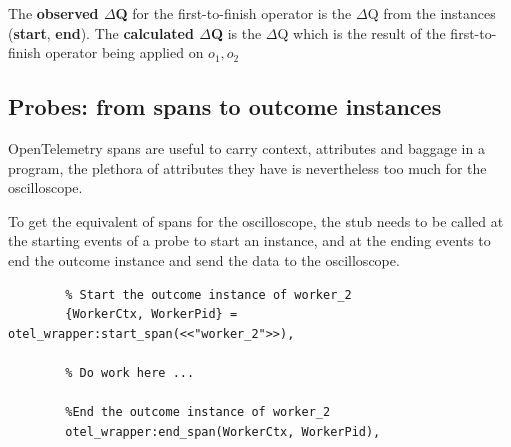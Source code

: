     The \textbf{observed $\Delta$Q} for the first-to-finish operator is the $\Delta$Q from the instances (\textbf{start}, \textbf{end}). The \textbf{calculated $\Delta$Q} is the $\Delta$Q which is the result of the first-to-finish operator being applied on $o_1, o_2$
        
    \subsection{Probes: from spans to outcome instances}
        OpenTelemetry spans are useful to carry context, attributes and baggage in a program, the plethora of attributes they have is nevertheless too much for the oscilloscope.

        To get the equivalent of spans for the oscilloscope, the stub needs to be called at the starting events of a probe to start an instance, and at the ending events to end the outcome instance and send the data to the oscilloscope.

        \begin{verbatim}
        % Start the outcome instance of worker_2 
        {WorkerCtx, WorkerPid} = otel_wrapper:start_span(<<"worker_2">>),
        
        % Do work here ...

        %End the outcome instance of worker_2
        otel_wrapper:end_span(WorkerCtx, WorkerPid),
        \end{verbatim}
